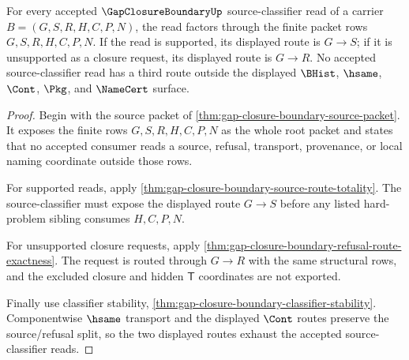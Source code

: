 \begin{theorem}
\label{thm:gap-closure-boundary-root-source-classifier-totality}
For every accepted $\GapClosureBoundaryUp$ source-classifier read of a carrier $B=(G,S,R,H,C,P,N)$, the read factors through the finite packet rows $G,S,R,H,C,P,N$. If the read is supported, its displayed route is $G \longrightarrow S$; if it is unsupported as a closure request, its displayed route is $G \longrightarrow R$. No accepted source-classifier read has a third route outside the displayed $\BHist$, $\hsame$, $\Cont$, $\Pkg$, and $\NameCert$ surface.
\end{theorem}
\begin{proof}
Begin with the source packet of \autoref{thm:gap-closure-boundary-source-packet}. It exposes the finite rows $G,S,R,H,C,P,N$ as the whole root packet and states that no accepted consumer reads a source, refusal, transport, provenance, or local naming coordinate outside those rows.

For supported reads, apply \autoref{thm:gap-closure-boundary-source-route-totality}. The source-classifier must expose the displayed route $G \longrightarrow S$ before any listed hard-problem sibling consumes $H,C,P,N$.

For unsupported closure requests, apply \autoref{thm:gap-closure-boundary-refusal-route-exactness}. The request is routed through $G \longrightarrow R$ with the same structural rows, and the excluded closure and hidden $\mathsf{T}$ coordinates are not exported.

Finally use classifier stability, \autoref{thm:gap-closure-boundary-classifier-stability}. Componentwise $\hsame$ transport and the displayed $\Cont$ routes preserve the source/refusal split, so the two displayed routes exhaust the accepted source-classifier reads.
\end{proof}

